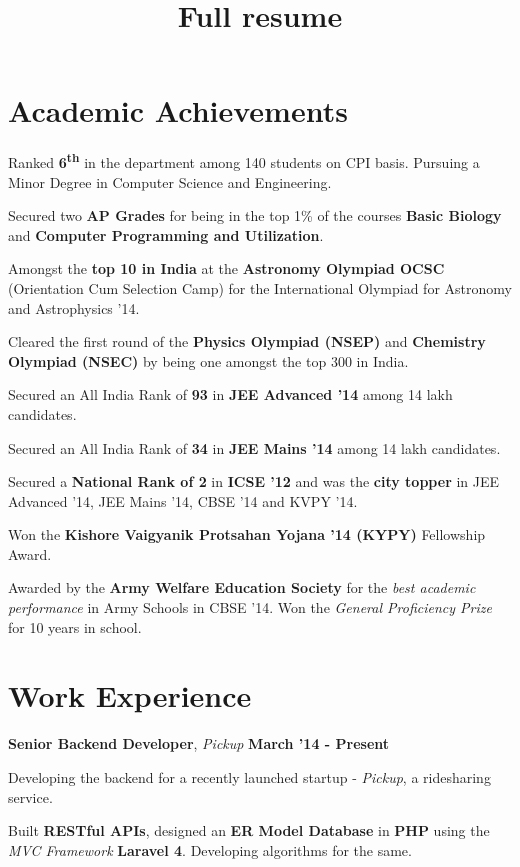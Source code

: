 \documentclass[11pt]{resume}
\title{Full resume}
\newcommand{\memph}[1]{#1}
\begin{document}
\vspace*{20mm}
\vspace{-2em}
\begin{resume}

\section{\mysidestyle Academic Achievements}
\begin{list2}
\item Ranked \textbf {6\textsuperscript{th}} in the department among 140 students on CPI basis. \memph Pursuing a Minor Degree in Computer Science and Engineering.
\item Secured two \textbf {AP Grades} for being in the top 1\% of the courses \textbf{Basic Biology} and \textbf{Computer Programming and Utilization}.
\item Amongst the \textbf{top 10 in India} at the \textbf {Astronomy Olympiad OCSC} (Orientation Cum Selection Camp) for the International Olympiad for Astronomy and Astrophysics '14.
\item Cleared the first round of the \textbf{Physics Olympiad (NSEP)} and \textbf{Chemistry Olympiad (NSEC)} by being one amongst the top 300 in India.
\item Secured an All India Rank of \textbf{93} in \textbf{JEE Advanced '14} among 14 lakh candidates.
\item Secured an All India Rank of \textbf{34} in \textbf{JEE Mains '14} among 14 lakh candidates.
\item Secured a \textbf{National Rank of 2} in \textbf{ICSE '12} and was the \textbf{city topper} in  JEE Advanced '14, JEE Mains '14, CBSE '14 and KVPY '14.
\item Won the \textbf {Kishore Vaigyanik Protsahan Yojana '14 (KYPY)} Fellowship Award.
\item Awarded by the \textbf {Army Welfare Education Society} for the \textit{best academic performance} in Army Schools in CBSE '14. Won the \textit{General Proficiency Prize} for 10 years in school. 
\end{list2}

\section{\mysidestyle Work Experience}
\textbf{Senior Backend Developer}, \textsl{Pickup} \hfill \textbf{March '14 - Present}

\begin{list2}
\item Developing the backend for a recently launched startup - \textit {Pickup}, a ridesharing service.
\item Built \textbf {RESTful APIs}, designed an \textbf {ER Model Database} in \textbf {PHP} using the \textit {MVC Framework} \textbf{Laravel 4}. Developing algorithms for the same.
\end{list2}


\end{resume}
\end{document}
